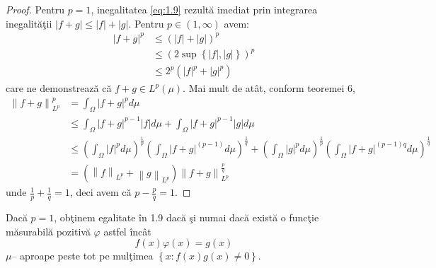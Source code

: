 \documentclass[a4paper,12pt,oneside]{report}
\begin{document}
\begin{proof}
Pentru \(p  = 1\), inegalitatea \ref{eq:1.9} rezult\u{a} imediat prin integrarea inegalit\u{a}\c{t}ii \(\left | f + g \right |\leq \left | f \right | + \left | g \right |\). Pentru \(p \in \left ( 1 , \infty  \right )\) avem:
\begin{equation} \nonumber
    \begin{split}
        \left | f + g  \right |^{p} &   \leq \left ( \left | f \right | +\left | g \right |\right )^{p} \\ & \leq \left ( 2 \sup\left \{ \left | f \right |,\left | g \right | \right \} \right )^{p} \\ & \leq 2^{p}\left ( \left | f \right |^{p}  + \left | g \right |^{p}\right )
    \end{split}
\end{equation}
care ne demonstreaz\u{a} c\u{a} \(f + g \in L^{p}\left ( \mu  \right )\). Mai mult de at\^{a}t, conform teoremei 6,
\begin{equation} \nonumber
    \begin{split}
         \left \| f + g  \right \|_{L^{p}}^{p}  &  = \int_{\Omega }\left | f + g \right |^{p}d\mu \\ & \leq \int_{\Omega }\left | f + g \right |^{p - 1}\left | f \right |d\mu + \int_{\Omega }\left | f + g  \right |^{p - 1}\left | g \right |d\mu \\ & \leq\left ( \int_{\Omega }\left | f \right |^{p}d\mu  \right )^{\frac{1}{p}}\left ( \int_{\Omega }\left | f + g  \right | ^{\left ( p - 1 \right )}d\mu \right )^{\frac{1}{q}}+ \left ( \int_{\Omega }\left | g \right |^{p}d\mu  \right )^{\frac{1}{p}}\left ( \int_{\Omega} \left | f + g \right |^{\left ( p - 1 \right )q}d\mu \right )^{\frac{1}{q}} \\ &  =\left ( \left \| f \right \|_{L^{p}} + \left \| g \right \|_{L^{p}} \right )\left \| f + g  \right \|_{L^{p}}^{\frac{p}{q}}
    \end{split}
\end{equation}
unde \(\frac{1}{p} + \frac{1}{q} = 1\), deci avem c\u{a} \(p - \frac{p}{q} = 1\).   
\end{proof}

Dac\u{a} \(p = 1\), ob\c{t}inem egalitate \^{i}n 1.9 dac\u{a} \c{s}i numai dac\u{a} exist\u{a} o func\c{t}ie m\u{a}surabil\u{a} pozitiv\u{a} \(\varphi\) astfel \^{i}nc\^{a}t
\begin{displaymath}
  f\left ( x \right )\varphi \left ( x \right ) = g\left ( x \right )
\end{displaymath}
\(\mu –\) aproape peste tot pe mul\c{t}imea \(\left \{ x : f\left ( x \right )g\left ( x \right )\neq 0 \right \}\).
\end{document}
